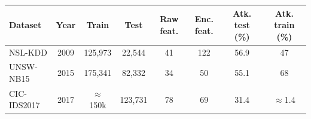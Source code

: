 \begin{tabular}{lccccccc}
\toprule
Dataset & Year & Train & Test & Raw feat. & Enc. feat. & Atk. test (\%) & Atk. train (\%) \\
\midrule
NSL-KDD & 2009 & 125,973 & 22,544 & 41 & 122 & 56.9 & 47 \\
UNSW-NB15 & 2015 & 175,341 & 82,332 & 34 & 50 & 55.1 & 68 \\
CIC-IDS2017 & 2017 & $\approx$150k & 123,731 & 78 & 69 & 31.4 & $\approx$1.4 \\
\bottomrule
\end{tabular}